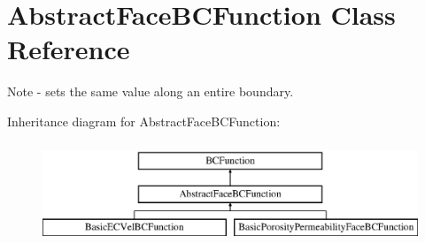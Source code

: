 \hypertarget{class_abstract_face_b_c_function}{\section{Abstract\-Face\-B\-C\-Function Class Reference}
\label{class_abstract_face_b_c_function}
}


Note -\/ sets the same value along an entire boundary.  


Inheritance diagram for Abstract\-Face\-B\-C\-Function\-:\begin{figure}[H]
\begin{center}
\leavevmode
\includegraphics[height=3.000000cm]{class_abstract_face_b_c_function}
\end{center}
\end{figure}
